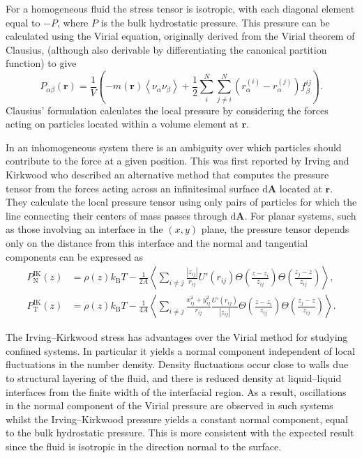 For a homogeneous fluid the stress tensor is isotropic, with each diagonal element equal to $- P$, where $P$ is the bulk hydrostatic pressure. 
This pressure can be calculated using the Virial equation, originally derived from the Virial theorem of Clausius\cite{Clausius}, (although also derivable by differentiating the canonical partition function\cite{MolTheoryCap}) to give
\begin{equation}
\label{VirialPressure}
P_{\alpha \beta}(\mathbf{r})=\frac{1}{V} \left( -m(\mathbf{r})\left< \nu_{\alpha} \nu_{\beta} \right> + \frac{1}{2} \sum_{i}^{N} \sum_{j \neq i}^{N} (r_{\alpha}^{(i)} - r_{\alpha}^{(j)})f_{\beta}^{ij} \right).
\end{equation}
Clausius' formulation calculates the local pressure by considering the forces acting on particles located within a volume element at $\mathbf{r}$.

In an inhomogeneous system there is an ambiguity over which particles should contribute to the force at a given position.\cite{MolTheoryCap,VarnikBinder,Rowlinson1982}
This was first reported by Irving and Kirkwood\cite{IrvingKirkwood1949,IrvingKirkwood1950} who described an alternative method that computes the pressure tensor from the forces acting across an infinitesimal surface $\mathrm{d}\mathbf{A}$ located at $\mathbf{r}$.
They calculate the local pressure tensor using only pairs of particles for which the line connecting their centers of mass passes through $\mathrm{d}\mathbf{A}$.
For planar systems, such as those involving an interface in the $(x,y)$ plane, the pressure tensor depends only on the distance from this interface and the normal and tangential components can be expressed as
\begin{align}
\label{IKpressureN}
P_{\mathrm{N}}^{\mathrm{IK}}(z) &= \rho(z)k_{\mathrm{B}}T-\frac{1}{2A} \left< \sum_{i \neq j} \frac{|z_{ij}|}{r_{ij}} U'(r_{ij}) \Theta \left( \frac{z-z_{i}}{z_{ij}}\right) \Theta \left( \frac{z_{j} - z}{z_{ij}} \right) \right>,\\
\label{IKpressureT}
P_{\mathrm{T}}^{\mathrm{IK}}(z) &= \rho(z)k_{\mathrm{B}}T-\frac{1}{4A} \left< \sum_{i \neq j} \frac{x^{2}_{ij} + y^{2}_{ij}}{r_{ij}} \frac{U'(r_{ij})}{|z_{ij}|} \Theta \left( \frac{z-z_{i}}{z_{ij}}\right) \Theta \left( \frac{z_{j} - z}{z_{ij}} \right) \right>.
\end{align}

The Irving--Kirkwood stress has advantages over the Virial method for studying confined systems.
In particular it yields a normal component independent of local fluctuations in the number density.
Density fluctuations occur close to walls due to structural layering of the fluid, and there is reduced density at liquid--liquid interfaces from the finite width of the interfacial region.
As a result, oscillations in the normal component of the Virial pressure are observed in such systems\cite{VarnikBinder} whilst the Irving--Kirkwood pressure yields a constant normal component, equal to the bulk hydrostatic pressure.
This is more consistent with the expected result since the fluid is isotropic in the direction normal to the surface.
